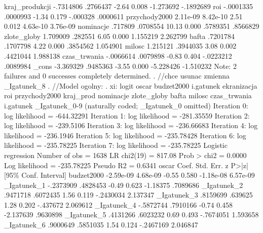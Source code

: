 \begin{stlog}
kraj_produkcji {\VBAR}  -.7314806   .2766437    -2.64   0.008    -1.273692   -.1892689
           roi {\VBAR}  -.0001335   .0000993    -1.34   0.179     -.000328    .0000611
 przychody2000 {\VBAR}   2.11e-09   8.42e-10     2.51   0.012     4.63e-10    3.76e-09
     nominacje {\VBAR}    .717809   .0708554    10.13   0.000     .5789351    .8566829
   zlote_globy {\VBAR}   1.709009    .282551     6.05   0.000     1.155219    2.262799
         bafta {\VBAR}   .7201784   .1707798     4.22   0.000     .3854562    1.054901
        milosc {\VBAR}   1.215121   .3944035     3.08   0.002     .4421044    1.988138
  czas_trwania {\VBAR}  -.0066614   .0079898    -0.83   0.404    -.0223212    .0089984
         _cons {\VBAR}  -3.369329   .9485363    -3.55   0.000    -5.228426   -1.510232
Note: 2 failures and 0 successes completely determined.
{\smallskip}
. //chce usunac zmienna _Igatunek_8
. //Model ogolny:
. xi: logit oscar  budzet2000 i.gatunek ekranizacja roi przychody2000 kraj_prod nominacje zlote_globy bafta
 milosc czas_trwania
i.gatunek         _Igatunek_0-9       (naturally coded; _Igatunek_0 omitted)
{\smallskip}
Iteration 0:   log likelihood = -644.32291  
Iteration 1:   log likelihood = -281.35559  
Iteration 2:   log likelihood =  -239.5106  
Iteration 3:   log likelihood = -236.66683  
Iteration 4:   log likelihood =  -236.1946  
Iteration 5:   log likelihood = -235.78428  
Iteration 6:   log likelihood = -235.78225  
Iteration 7:   log likelihood = -235.78225  
{\smallskip}
Logistic regression                               Number of obs   =       1638
                                                  LR chi2(19)     =     817.08
                                                  Prob > chi2     =     0.0000
Log likelihood = -235.78225                       Pseudo R2       =     0.6341
{\smallskip}
         oscar {\VBAR}      Coef.   Std. Err.      z    P>|z|     [95\% Conf. Interval]
    budzet2000 {\VBAR}  -2.59e-09   4.68e-09    -0.55   0.580    -1.18e-08    6.57e-09
   _Igatunek_1 {\VBAR}  -.2373909   .4828453    -0.49   0.623     -1.18375    .7089686
   _Igatunek_2 {\VBAR}   .9471718   .6072435     1.56   0.119    -.2430034    2.137347
   _Igatunek_3 {\VBAR}   .8159699    .639625     1.28   0.202     -.437672    2.069612
   _Igatunek_4 {\VBAR}  -.5872744   .7910166    -0.74   0.458    -2.137639    .9630898
   _Igatunek_5 {\VBAR}   .4131266   .6023232     0.69   0.493    -.7674051    1.593658
   _Igatunek_6 {\VBAR}   .9000649   .5851035     1.54   0.124    -.2467169    2.046847

\end{stlog}
